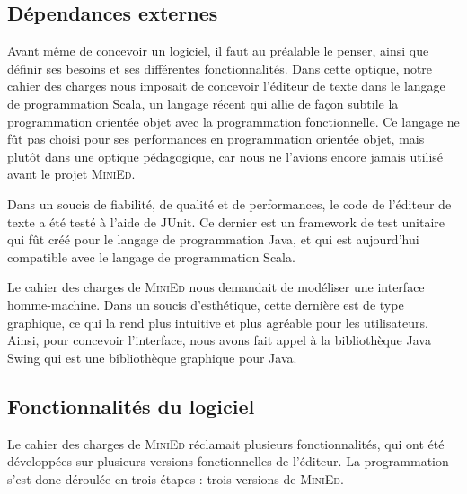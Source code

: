 \documentclass[a4paper]{article}
\begin{document}
	\vspace{0.5cm}

		\subsection{Dépendances externes}

		\vspace{0.5cm}

		Avant même de concevoir un logiciel, il faut au préalable le penser, ainsi que définir ses besoins et ses différentes fonctionnalités. Dans cette optique, notre cahier des charges nous imposait de concevoir l’éditeur de texte dans le langage de programmation Scala, un langage récent qui allie de façon subtile la programmation orientée objet avec la programmation fonctionnelle. Ce langage ne fût pas choisi pour ses performances en programmation orientée objet, mais plutôt dans une optique pédagogique, car nous ne l'avions encore jamais utilisé avant le projet \textsc{MiniEd}.

		\vspace{0.5cm}

		Dans un soucis de fiabilité, de qualité et de performances, le code de l'éditeur de texte a été testé à l'aide de JUnit. Ce dernier est un framework de test unitaire qui fût créé pour le langage de programmation Java, et qui est aujourd’hui compatible avec le langage de programmation Scala.

		\vspace{0.5cm}

		Le cahier des charges de \textsc{MiniEd} nous demandait de modéliser une interface homme-machine. Dans un soucis d'esthétique, cette dernière est de type graphique, ce qui la rend plus intuitive et plus agréable pour les utilisateurs. Ainsi, pour concevoir l'interface, nous avons fait appel à la bibliothèque Java Swing qui est une bibliothèque graphique pour Java.

		\vspace{0.5cm}

		\subsection{Fonctionnalités du logiciel}

		\vspace{0.5cm}

		Le cahier des charges de \textsc{MiniEd} réclamait plusieurs fonctionnalités, qui ont été développées sur plusieurs versions fonctionnelles de l'éditeur. La programmation s'est donc déroulée en trois étapes : trois versions de \textsc{MiniEd}.
\end{document}

